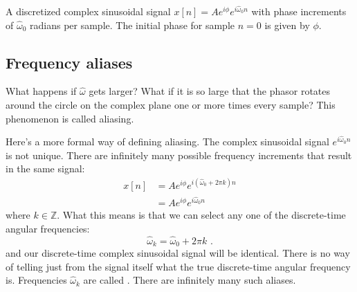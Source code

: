 \begin{marginfigure}
\begin{center}
  \end{center}
  \caption{A discretized complex sinusoidal signal $x[n] = A e^{i\phi}e^{i\hat{\omega}_0n}$ 
  with phase increments of $\hat{\omega}_0$ radians per sample. The initial phase for sample $n=0$ is given by $\phi$.}
  \label{fig:rotating_dt_phasor}
\end{marginfigure}

\subsection{Frequency aliases}
What happens if $\hat{\omega}$ gets larger? What if it is so large that the phasor rotates 
around the circle on the complex plane one or more times every sample? 
This phenomenon is called aliasing.

Here's a more formal way of defining aliasing. The complex sinusoidal
signal $e^{i\hat{\omega}_0 n}$ is not unique. There are infinitely
many possible frequency increments that result in the same signal:
\begin{align}
  x[n] & =Ae^{i\phi} e^{i(\hat{\omega}_0 + 2\pi k) n} \\
       & =Ae^{i\phi} e^{i \hat{\omega}_0  n}
\end{align}
where $k\in\mathbb{Z}$. What this means is that we can select any one
of the discrete-time angular frequencies:
\begin{equation}
  \boxed{
    \hat{\omega}_k = \hat{\omega}_0 + 2\pi k
  }\,\,.
\end{equation}
and our discrete-time complex sinusoidal signal will be
identical. There is no way of telling just from the signal itself what
the true discrete-time angular frequency is. Frequencies
$\hat{\omega}_k$ are called \emph{}. There are
infinitely many such aliases.

